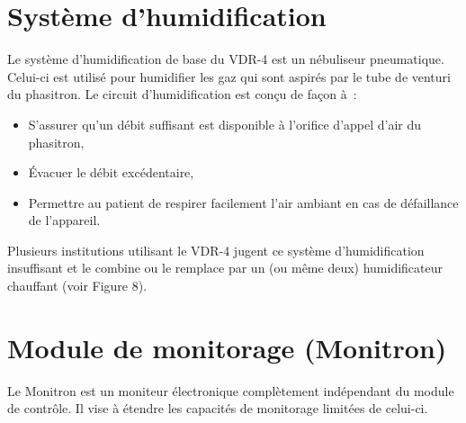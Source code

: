 
\section{Système d’humidification}

Le système d’humidification de base du VDR-4 est un nébuliseur pneumatique. Celui-ci est utilisé pour humidifier les gaz qui sont aspirés par le tube de venturi du phasitron. Le circuit d’humidification est conçu de façon à :

\begin{itemize}
	\item S’assurer qu’un débit suffisant est disponible à l’orifice d’appel d’air du phasitron,
	\item Évacuer le débit excédentaire,
	\item Permettre au patient de respirer facilement l’air ambiant en cas de défaillance de l’appareil.
\end{itemize}

Plusieurs institutions utilisant le VDR-4 jugent ce système d’humidification insuffisant et le combine ou le remplace par un (ou même deux) humidificateur chauffant (voir Figure 8).



\section{Module de monitorage (Monitron)}

Le Monitron est un moniteur électronique complètement indépendant du module de contrôle. Il vise à étendre les capacités de monitorage limitées de celui-ci.

